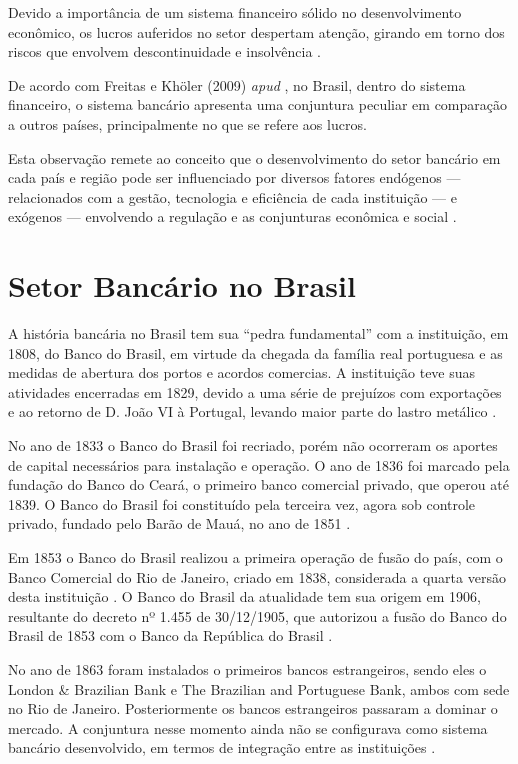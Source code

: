 \documentclass[
  12pt,
  12pt,
  openright,
  oneside,
  a4paper,
  chapter=TITLE,
  section=TITLE,
  subsection=TITLE,
  subsubsection=TITLE,
  portugues,
  sumario=tradicional]{abntex2}
\begin{document}
Devido a importância de um sistema financeiro sólido no desenvolvimento econômico, os lucros auferidos no setor despertam atenção, girando em torno dos riscos que envolvem descontinuidade e insolvência \cite{couto:2002}.

De acordo com Freitas e Khöler (2009) \emph{apud} \textcite{dantas:2012}, no Brasil, dentro do sistema financeiro, o sistema bancário apresenta uma conjuntura peculiar em comparação a outros países, principalmente no que se refere aos lucros.

Esta observação remete ao conceito que o desenvolvimento do setor bancário em cada país e região pode ser influenciado por diversos fatores endógenos --- relacionados com a gestão, tecnologia e eficiência de cada instituição --- e exógenos --- envolvendo a regulação e as conjunturas econômica e social \cite{rover:2011}.

\section{Setor Bancário no Brasil}

A história bancária no Brasil tem sua ``pedra fundamental'' com a instituição, em 1808, do Banco do Brasil, em virtude da chegada da família real portuguesa e as medidas de abertura dos portos e acordos comercias. A instituição teve suas atividades encerradas em 1829, devido a uma série de prejuízos com exportações e ao retorno de D. João VI à Portugal, levando maior parte do lastro metálico \cite{costaneto:2004, camargo:2009}.

No ano de 1833 o Banco do Brasil foi recriado, porém não ocorreram os aportes de capital necessários para instalação e operação. O ano de 1836 foi marcado pela fundação do Banco do Ceará, o primeiro banco comercial privado, que operou até 1839. O Banco do Brasil foi constituído pela terceira vez, agora sob controle privado, fundado pelo Barão de Mauá, no ano de 1851 \cite{costaneto:2004, camargo:2009}.

Em 1853 o Banco do Brasil realizou a primeira operação de fusão do país, com o Banco Comercial do Rio de Janeiro, criado em 1838, considerada a quarta versão desta instituição \cite{camargo:2009}. O Banco do Brasil da atualidade tem sua origem em 1906, resultante do decreto nº 1.455 de 30/12/1905, que autorizou a fusão do Banco do Brasil de 1853 com o Banco da República do Brasil \cite{camargo:2009, Lei:1455:1905, costaneto:2004}.

No ano de 1863 foram instalados o primeiros bancos estrangeiros, sendo eles o London \& Brazilian Bank e The Brazilian and Portuguese Bank, ambos com sede no Rio de Janeiro. Posteriormente os bancos estrangeiros passaram a dominar o mercado. A conjuntura nesse momento ainda não se configurava como sistema bancário desenvolvido, em termos de integração entre as instituições \cite{camargo:2009, guimaraes:2011, mendes:2014}.
\end{document}
